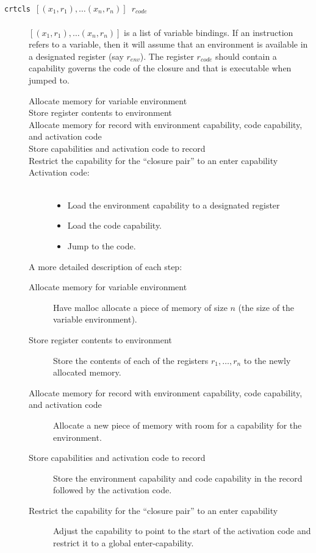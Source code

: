 \documentclass[a4paper]{article}
\newcommand{\forcenewline}{$\phantom{v}$\\}
\newcommand{\var}[1]{\mathit{#1}}
\begin{document}
\begin{description}
\item[\texttt{crtcls $[(x_1,r_1),\dots(x_n,r_n)]$ $r_{\var{code}}$}] \forcenewline
  $[(x_1,r_1),\dots(x_n,r_n)]$ is a list of variable bindings. If an instruction refers to a variable, then it will assume that an environment is available in a designated register (say $r_{\var{env}}$). The register $r_{\var{code}}$ should contain a capability governs the code of the closure and that is executable when jumped to.
  \begin{description}
  \item[Allocate memory for variable environment]
  \item[Store register contents to environment]
  \item[Allocate memory for record with environment capability, code capability, and activation code]
  \item[Store capabilities and activation code to record]
  \item[Restrict the capability for the ``closure pair'' to an enter capability]
  \item[Activation code:] \forcenewline
    \begin{itemize}
    \item Load the environment capability to a designated register
    \item Load the code capability.
    \item Jump to the code.
    \end{itemize}
  \end{description}
  A more detailed description of each step:
  \begin{description}
  \item[Allocate memory for variable environment] Have malloc allocate a piece of memory of size $n$ (the size of the variable environment). 
  \item[Store register contents to environment] Store the contents of each of the registers $r_1,\dots,r_n$ to the newly allocated memory.
  \item[Allocate memory for record with environment capability, code capability, and activation code] Allocate a new piece of memory with room for a capability for the environment.
  \item[Store capabilities and activation code to record] Store the environment capability and code capability in the record followed by the activation code. 
  \item[Restrict the capability for the ``closure pair'' to an enter capability] Adjust the capability to point to the start of the activation code and restrict it to a global enter-capability.

\end{description}
\end{description}
\end{document}

